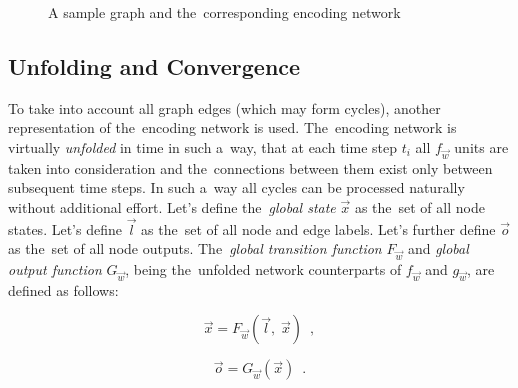 \documentclass{llncs}
\begin{document}
\begin{figure}[h!]
\begin{center}
	\caption[]{A sample graph and the~corresponding encoding network}
	\label{fig:gnn_encoding}
\end{center}
\end{figure}


\subsection{Unfolding and Convergence}
To take into account all graph edges (which may form cycles), another representation of the~encoding network is used. The~encoding network is virtually \emph{unfolded} in time in such a~way, that at each time step $t_i$ all $f_{\vec{w}}$ units are taken into consideration and the~connections between them exist only between subsequent time steps. In such a~way all cycles can be processed naturally without additional effort. Let's define the~\emph{global state} $\vec{x}$ as the~set of all node states. Let's define $\vec{l}$ as the~set of all node and edge labels. Let's further define $\vec{o}$ as the~set of all node outputs. The~\emph{global transition function} $F_{\vec{w}}$ and \emph{global output function} $G_{\vec{w}}$, being the~unfolded network counterparts of $f_{\vec{w}}$ and $g_{\vec{w}}$, are defined as follows:

\begin{equation}
\vec{x} = F_{\vec{w}}(\vec{l}, \; \vec{x}) \enspace ,
\label{eq:gnn_fglobal}
\end{equation}

\begin{equation}
\vec{o} = G_{\vec{w}}(\vec{x}) \enspace .
\label{eq:gnn_gglobal}
\end{equation}
\end{document}
